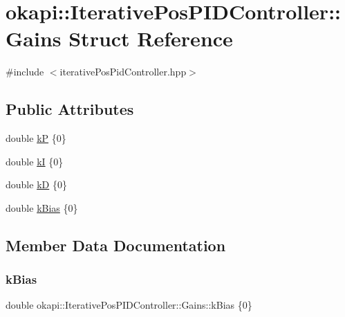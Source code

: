 \hypertarget{structokapi_1_1IterativePosPIDController_1_1Gains}{}\section{okapi\+::Iterative\+Pos\+P\+I\+D\+Controller\+::Gains Struct Reference}
\label{structokapi_1_1IterativePosPIDController_1_1Gains}


{\ttfamily \#include $<$iterative\+Pos\+Pid\+Controller.\+hpp$>$}

\subsection*{Public Attributes}
\begin{DoxyCompactItemize}
\item 
double \mbox{\hyperlink{structokapi_1_1IterativePosPIDController_1_1Gains_afe6336add0771e75884db9edf272ae56}{kP}} \{0\}
\item 
double \mbox{\hyperlink{structokapi_1_1IterativePosPIDController_1_1Gains_ad3fd4e3ac5980917b3d98dc486f0c51d}{kI}} \{0\}
\item 
double \mbox{\hyperlink{structokapi_1_1IterativePosPIDController_1_1Gains_a7f867052ff5d78bc7ed9bb3997178186}{kD}} \{0\}
\item 
double \mbox{\hyperlink{structokapi_1_1IterativePosPIDController_1_1Gains_aaf9ce6bbf78c786af3bd95f68c9f7fab}{k\+Bias}} \{0\}
\end{DoxyCompactItemize}


\subsection{Member Data Documentation}
\mbox{\label{structokapi_1_1IterativePosPIDController_1_1Gains_aaf9ce6bbf78c786af3bd95f68c9f7fab}} 
\subsubsection{\texorpdfstring{kBias}{kBias}}
{\footnotesize\ttfamily double okapi\+::\+Iterative\+Pos\+P\+I\+D\+Controller\+::\+Gains\+::k\+Bias \{0\}}

\mbox{\label{structokapi_1_1IterativePosPIDController_1_1Gains_a7f867052ff5d78bc7ed9bb3997178186}} 
